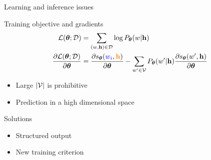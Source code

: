 \begin{frame}{Learning and inference issues}
  \begin{block}{Training objective and gradients}
    \begin{align*}
      \fullloss &=  \sum_{(\ws,\wcontext) \in \dataset}  \log P_{\params}(\ws|\wcontext) \\
      \frac{\partial\fullloss }{ \partial\params} &=  \frac{\partial  \whscore} {\partial \params} - \sum_{\ws'\in\vocab} P_{\params}(\ws'|\wcontext)  \frac{ \partial  s_{\params}(\ws',\wcontext)}{\partial \params}
    \end{align*}
    \begin{itemize}
    \item Large $|{\mathcal{V}}|$ is prohibitive
    \item Prediction in a high dimensional space
    \end{itemize}
  \end{block}
  \begin{block}{Solutions}
    \begin{itemize}
    \item Structured output~\cite{Le10Training,Le11Soul,Le13SOUL}
    \item New training criterion~\cite{Mnih12Fast,labeau17NCE}
    \end{itemize}
  \end{block}
\end{frame}


